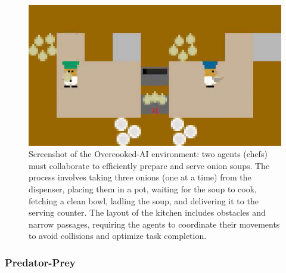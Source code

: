 \begin{figure}[h!]
  \centering
  \includegraphics[trim=0cm -0.5cm 0cm -0.5cm, clip, width=0.9\linewidth]{figures/overcooked.png}
  \caption[Screenshot of the Overcooked-AI environment]{Screenshot of the Overcooked-AI environment: two agents (chefs) must collaborate to efficiently prepare and serve onion soups. The process involves taking three onions (one at a time) from the dispenser, placing them in a pot, waiting for the soup to cook, fetching a clean bowl, ladling the soup, and delivering it to the serving counter. The layout of the kitchen includes obstacles and narrow passages, requiring the agents to coordinate their movements to avoid collisions and optimize task completion.}
  \label{fig:overcooked}
\end{figure}

\subsubsection*{Predator-Prey}

